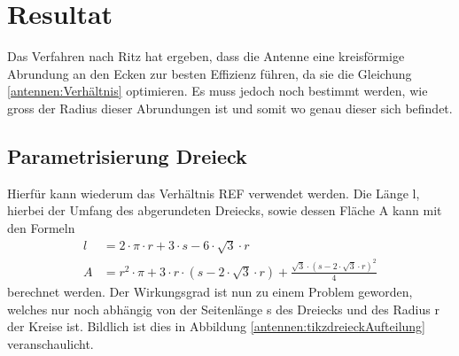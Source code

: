 %
%
% 
%
%

\section{Resultat\label{antennen:resultat}}

Das Verfahren nach Ritz hat ergeben, dass die Antenne eine kreisförmige Abrundung an den Ecken 
zur besten Effizienz führen, da sie die Gleichung \eqref{antennen:Verhältnis} optimieren. 
Es muss jedoch noch bestimmt werden, wie gross der Radius dieser Abrundungen ist und somit wo
genau dieser sich befindet. 

\subsection{Parametrisierung Dreieck\label{antennen:param3eck}}
Hierfür kann wiederum das Verhältnis REF verwendet werden. Die Länge l, hierbei der Umfang 
des abgerundeten Dreiecks, sowie dessen Fläche A kann mit den Formeln
\begin{align}
	l &= 2 \cdot \pi \cdot r + 3 \cdot s - 6 \cdot \sqrt{3} \cdot r \tag{20.24} \label{antennen:Länge} \\
	A &= r^2 \cdot \pi + 3 \cdot r \cdot (s - 2 \cdot \sqrt{3} \cdot r) + \frac{\sqrt{3} \cdot (s - 2 \cdot \sqrt{3} \cdot r)^2}{4} \tag{20.25} \label{antennen:Fläche}
\end{align}
\setcounter{equation}{25}
berechnet werden.
Der Wirkungsgrad ist nun zu einem Problem geworden, welches nur noch abhängig von 
der Seitenlänge s des Dreiecks und des Radius r der Kreise ist. Bildlich ist dies 
in Abbildung \ref{antennen:tikzdreieckAufteilung} veranschaulicht.

